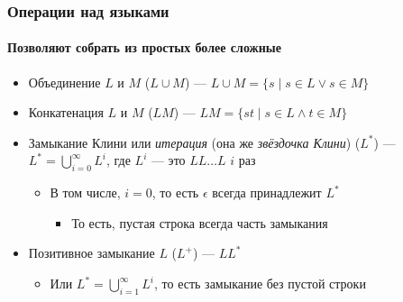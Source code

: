 \documentclass{../../slides-style}
\begin{document}
    \begin{frame}
        \frametitle{Операции над языками}
        \framesubtitle{Позволяют собрать из простых более сложные}
        \begin{itemize}
            \item Объединение $L$ и $M$ ($L \cup M$) --- $L \cup M = \{s \mid s \in L \vee s \in M\}$
            \item Конкатенация $L$ и $M$ ($LM$) --- $LM = \{st \mid s \in L \wedge t \in M\}$
            \item Замыкание Клини или \textit{итерация} (она же \textit{звёздочка Клини}) ($L^*$) --- 
                $L^* = \bigcup\limits_{i=0}^{\infty}L^i$, где $L^i$ --- это $LL \ldots L$ $i$ раз
            \begin{itemize}
                \item В том числе, $i = 0$, то есть $\epsilon$ всегда принадлежит $L^*$
                \begin{itemize}
                    \item То есть, пустая строка всегда часть замыкания
                \end{itemize}
            \end{itemize}
            \item Позитивное замыкание $L$ ($L^+$) --- $LL^*$
            \begin{itemize}
                \item Или $L^* = \bigcup\limits_{i=1}^{\infty}L^i$, то есть замыкание без пустой строки
            \end{itemize}
        \end{itemize}
    \end{frame}
\end{document}
